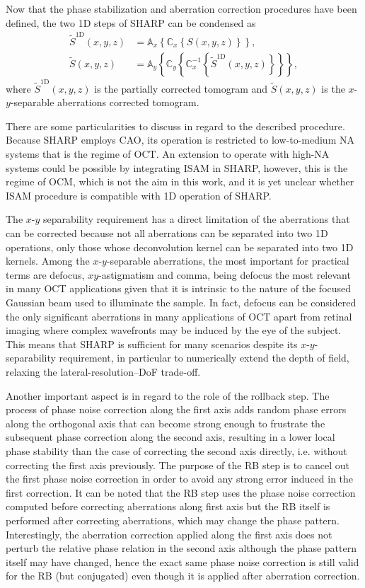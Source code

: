Now that the phase stabilization and aberration correction procedures have been defined, the two 1D steps of SHARP can be condensed as
\begin{align}\label{eq:SHARP}
    \tilde{S}^{\text{1D}}(x,y,z) &= \mathbb{A}_x\left\{ \mathbb{C}_x\left\{ S(x,y,z) \right\} \right\}, \\
    \tilde{S}(x,y,z) &= \mathbb{A}_y\left\{ \mathbb{C}_y\left\{ \mathbb{C}^{-1}_x\left\{  \tilde{S}^{\text{1D}}(x,y,z) \right\} \right\} \right\},
\end{align}
where $\tilde{S}^{\text{1D}}(x,y,z)$ is the partially corrected tomogram and $\tilde{S}(x,y,z)$ is the $x$-$y$-separable aberrations corrected tomogram.

There are some particularities to discuss in regard to the described procedure. Because SHARP employs CAO, its operation is restricted to low-to-medium NA systems that is the regime of OCT. An extension to operate with high-NA systems could be possible by integrating ISAM in SHARP, however, this is the regime of OCM, which is not the aim in this work, and it is yet unclear whether ISAM procedure is compatible with 1D operation of SHARP.

The $x$-$y$ separability requirement has a direct limitation of the aberrations that can be corrected because not all aberrations can be separated into two 1D operations, only those whose deconvolution kernel can be separated into two 1D kernels. Among the $x$-$y$-separable aberrations, the most important for practical terms are defocus, $xy$-astigmatism and comma, being defocus the most relevant in many OCT applications given that it is intrinsic to the nature of the focused Gaussian beam used to illuminate the sample. In fact, defocus can be considered the only significant aberrations in many applications of OCT apart from retinal imaging where complex wavefronts may be induced by the eye of the subject. This means that SHARP is sufficient for many scenarios despite its $x$-$y$-separability requirement, in particular to numerically extend the depth of field, relaxing the lateral-resolution--DoF trade-off.

Another important aspect is in regard to the role of the rollback step. The process of phase noise correction along the first axis adds random phase errors along the orthogonal axis that can become strong enough to frustrate the subsequent phase correction along the second axis, resulting in a lower local phase stability than the case of correcting the second axis directly, i.e. without correcting the first axis previously. The purpose of the RB step is to cancel out the first phase noise correction in order to avoid any strong error induced in the first correction. It can be noted that the RB step uses the phase noise correction computed before correcting aberrations along first axis but the RB itself is performed after correcting aberrations, which may change the phase pattern. Interestingly, the aberration correction applied along the first axis does not perturb the relative phase relation in the second axis although the phase pattern itself may have changed, hence the exact same phase noise correction is still valid for the RB (but conjugated) even though it is applied after aberration correction.


